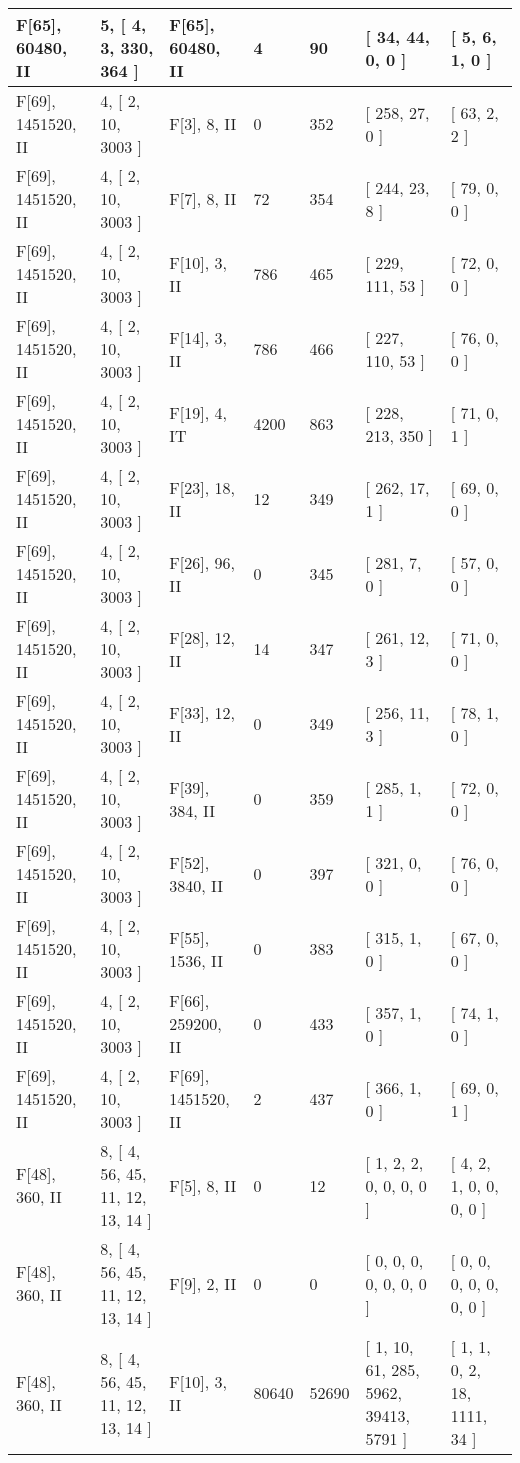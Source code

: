 \documentclass[9 pt]{scrartcl}
\begin{document}
\begin{longtable}{ |p{3em}|p{6em}|p{3em}|p{2em}|p{2em}|p{6em}|p{6em}| }
F[65], 60480, II &5, [ 4, 3, 330, 364 ] & F[65], 60480, II  & 4 & 90 & [ 34, 44, 0, 0 ] & [ 5, 6, 1, 0 ]\\ \hline
F[69], 1451520, II &4, [ 2, 10, 3003 ] & F[3], 8, II  & 0 & 352 & [ 258, 27, 0 ] & [ 63, 2, 2 ]\\ \hline
F[69], 1451520, II &4, [ 2, 10, 3003 ] & F[7], 8, II  & 72 & 354 & [ 244, 23, 8 ] & [ 79, 0, 0 ]\\ \hline
F[69], 1451520, II &4, [ 2, 10, 3003 ] & F[10], 3, II  & 786 & 465 & [ 229, 111, 53 ] & [ 72, 0, 0 ]\\ \hline
F[69], 1451520, II &4, [ 2, 10, 3003 ] & F[14], 3, II  & 786 & 466 & [ 227, 110, 53 ] & [ 76, 0, 0 ]\\ \hline
F[69], 1451520, II &4, [ 2, 10, 3003 ] & F[19], 4, IT  & 4200 & 863 & [ 228, 213, 350 ] & [ 71, 0, 1 ]\\ \hline
F[69], 1451520, II &4, [ 2, 10, 3003 ] & F[23], 18, II  & 12 & 349 & [ 262, 17, 1 ] & [ 69, 0, 0 ]\\ \hline
F[69], 1451520, II &4, [ 2, 10, 3003 ] & F[26], 96, II  & 0 & 345 & [ 281, 7, 0 ] & [ 57, 0, 0 ]\\ \hline
F[69], 1451520, II &4, [ 2, 10, 3003 ] & F[28], 12, II  & 14 & 347 & [ 261, 12, 3 ] & [ 71, 0, 0 ]\\ \hline
F[69], 1451520, II &4, [ 2, 10, 3003 ] & F[33], 12, II  & 0 & 349 & [ 256, 11, 3 ] & [ 78, 1, 0 ]\\ \hline
F[69], 1451520, II &4, [ 2, 10, 3003 ] & F[39], 384, II  & 0 & 359 & [ 285, 1, 1 ] & [ 72, 0, 0 ]\\ \hline
F[69], 1451520, II &4, [ 2, 10, 3003 ] & F[52], 3840, II  & 0 & 397 & [ 321, 0, 0 ] & [ 76, 0, 0 ]\\ \hline
F[69], 1451520, II &4, [ 2, 10, 3003 ] & F[55], 1536, II  & 0 & 383 & [ 315, 1, 0 ] & [ 67, 0, 0 ]\\ \hline
F[69], 1451520, II &4, [ 2, 10, 3003 ] & F[66], 259200, II  & 0 & 433 & [ 357, 1, 0 ] & [ 74, 1, 0 ]\\ \hline
F[69], 1451520, II &4, [ 2, 10, 3003 ] & F[69], 1451520, II  & 2 & 437 & [ 366, 1, 0 ] & [ 69, 0, 1 ]\\ \hline
F[48], 360, II &8, [ 4, 56, 45, 11, 12, 13, 14 ] & F[5], 8, II  & 0 & 12 & [ 1, 2, 2, 0, 0, 0, 0 ] & [ 4, 2, 1, 0, 0, 0, 0 ]\\ \hline
F[48], 360, II &8, [ 4, 56, 45, 11, 12, 13, 14 ] & F[9], 2, II  & 0 & 0 & [ 0, 0, 0, 0, 0, 0, 0 ] & [ 0, 0, 0, 0, 0, 0, 0 ]\\ \hline
F[48], 360, II &8, [ 4, 56, 45, 11, 12, 13, 14 ] & F[10], 3, II  & 80640 & 52690 & [ 1, 10, 61, 285, 5962, 39413, 5791 ] & [ 1, 1, 0, 2, 18, 1111, 34 ]\\ \hline

\end{longtable}
\end{document}
